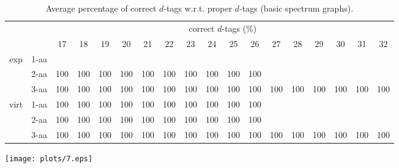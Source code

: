 \documentclass{article}
\begin{document}
\begin{table}[h]\tiny
\vspace{3mm}
{\centering
\begin{center}
\begin{tabular}{|c|l|c|c|c|c|c|c|c|c|c|c|c|c|c|c|c|c|}
  \hline
  \multicolumn{2}{|c|}{ } & \multicolumn{ 16 }{|c|}{ correct $d$-tags (\%)} \\
  \cline{3- 18}
  \multicolumn{2}{|c|}{ }  & 17 & 18 & 19 & 20 & 21 & 22 & 23 & 24 & 25 & 26 & 27 & 28 & 29 & 30 & 31 & 32\\
  \hline
  \multirow{3}{*}{exp}
&  1-aa  &  &  &  &  &  &  &  &  &  &  &  &  &  &  &  & \\&  2-aa  & 100 & 100 & 100 & 100 & 100 & 100 & 100 & 100 & 100 & 100 &  &  &  &  &  & \\&  3-aa  & 100 & 100 & 100 & 100 & 100 & 100 & 100 & 100 & 100 & 100 & 100 & 100 & 100 & 100 & 100 & 100\\ \hline
  \multirow{3}{*}{virt} 
&  1-aa  & 100 & 100 & 100 & 100 & 100 & 100 & 100 & 100 & 100 & 100 &  &  &  &  &  & \\&  2-aa  & 100 & 100 & 100 & 100 & 100 & 100 & 100 & 100 & 100 & 100 &  &  &  &  &  & \\&  3-aa  & 100 & 100 & 100 & 100 & 100 & 100 & 100 & 100 & 100 & 100 & 100 & 100 & 100 & 100 & 100 & 100\\ \hline
\end{tabular}
\end{center}
\par}
\centering
\caption{ Average percentage of correct $d$-tags w.r.t. proper $d$-tags (basic spectrum graphs).}
\vspace{3mm}
\label{table:correct-vs-proper-d-tags}
\end{table}


\texttt{[image: plots/7.eps]}
\end{document}
